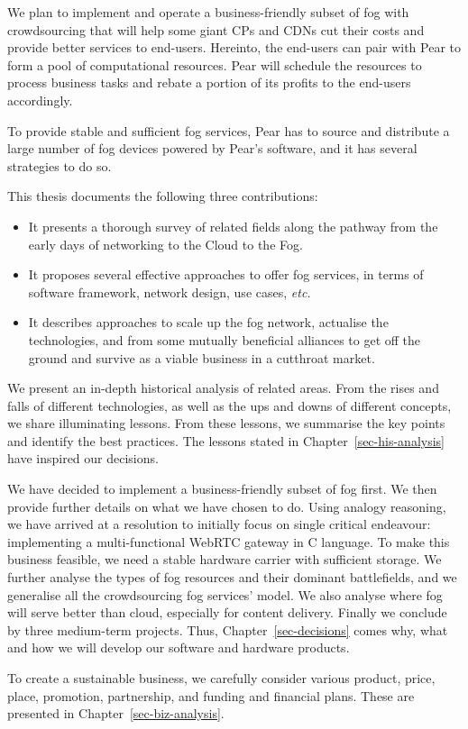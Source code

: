 We plan to implement and operate a business-friendly subset of fog with crowdsourcing that will help some giant CPs and CDNs cut their costs and provide better services to end-users. Hereinto, the end-users can pair with Pear to form a pool of computational resources. 
Pear will schedule the resources to process business tasks and rebate a portion of its profits to the end-users accordingly. 

To provide stable and sufficient fog services, Pear has to source and distribute a large number of fog devices powered by Pear's software, and it has several strategies to do so. %

This thesis documents the following three contributions:
\begin{itemize}
	\item It presents a thorough survey of related fields along the pathway from the early days of networking to the Cloud to the Fog. 
	\item It proposes several effective approaches to offer fog services, in terms of software framework, network design, use cases, {\em etc.}
	\item It describes approaches to scale up the fog network, actualise the technologies, and from some mutually beneficial alliances to get off the ground and survive as a viable business in a cutthroat market. 
\end{itemize} 

We present an in-depth historical analysis of related areas. From the rises and falls of different technologies, as well as the ups and downs of different concepts, we share illuminating lessons. From these lessons, we summarise the key points and identify the best practices.   
The lessons stated in Chapter~\ref{sec-his-analysis} have inspired our decisions. 

We have decided to implement a business-friendly subset of fog first. We then provide further details on what we have chosen to do. Using analogy reasoning, we have arrived at a resolution to initially focus on single critical endeavour: implementing a multi-functional WebRTC gateway in C language. To make this business feasible, we need a stable hardware carrier with sufficient storage. We further analyse the types of fog resources and their dominant battlefields, and we generalise all the crowdsourcing fog services' model. We also analyse where fog will serve better than cloud, especially for content delivery. Finally we conclude by three medium-term projects. Thus, Chapter~\ref{sec-decisions} comes why, what and how we will develop our software and hardware products. 

To create a sustainable business, we carefully consider various product, price, place, promotion, partnership, and funding and financial plans. These are presented in Chapter~\ref{sec-biz-analysis}. 
